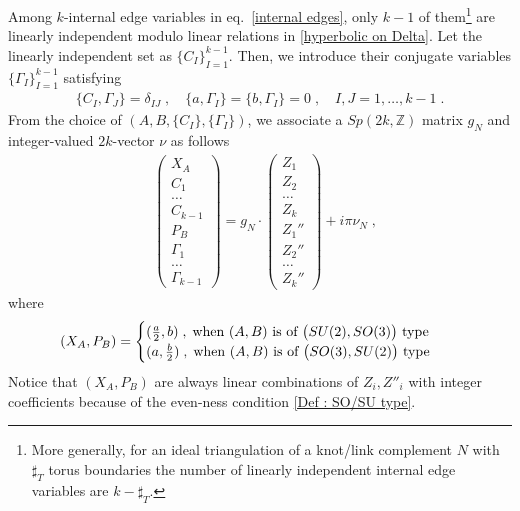 \documentclass[a4paper,11pt]{article}
\begin{document}
Among $k$-internal edge variables in eq.~\eqref{internal edges},  only $k-1$ of them\footnote{More generally, for an ideal triangulation of  a knot/link complement $N$  with $\sharp_T$ torus boundaries the number of linearly independent internal edge variables are $k-\sharp_T$. } are linearly independent modulo linear relations in \eqref{hyperbolic on Delta}. Let the linearly independent set as $\{C_I\}_{I=1}^{k-1}$. Then, we introduce their conjugate variables $\{\Gamma_I\}_{I=1}^{k-1}$ satisfying
%
\begin{align}
\{ C_I, \Gamma_J\}= \delta_{IJ}\;, \quad \{ a, \Gamma_I\} = \{ b, \Gamma_I\}=0\;, \quad I,J=1,\ldots, k-1\;.
\end{align}
%
From the choice of $(A,B,\{ C_I\}, \{\Gamma_I\})$, we associate a $Sp(2k,\mathbb{Z})$ matrix $g_{N}$ and integer-valued $2k$-vector $\nu$ as follows
%
%
\begin{align}
&\left(\begin{array}{c}X_A \\C_1  \\ \ldots \\ C_{k-1}\\ P_B \\ \Gamma_1 \\ \ldots \\ \Gamma_{k-1}\end{array}\right) = g_{N} \cdot  \left(\begin{array}{c}Z_1 \\ Z_2  \\ \ldots \\ Z_{k}\\ Z_1'' \\ Z_2'' \\ \ldots \\ Z_{k}'' \end{array}\right) + i \pi \nu_{N}\;, \label{g_N}
\end{align}
where
\begin{align}
&(X_A, P_B) = 
\begin{cases}
 (\frac{a} 2,b)\;,\;\textrm{when $(A,B)$ is of  $\big{(}SU(2),SO(3)\big{)}$ type}
 \\
(a,\frac{b}2 )\;,\;\textrm{when $(A,B)$ is of $\big{(}SO(3),SU(2)\big{)}$ type} \end{cases} \label{(XA,PB)}
\end{align}
%
Notice that $(X_A, P_B)$ are always linear combinations of $Z_i, Z''_i$ with integer coefficients because of the even-ness condition \eqref{Def : SO/SU type}.
\end{document}
